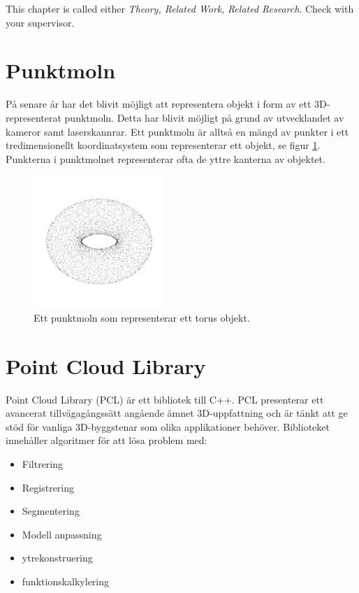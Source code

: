 This chapter is called either \emph{Theory, Related Work}, 
\emph{Related Research}. Check with your supervisor.
\newpage










\section{Punktmoln}
På senare år har det blivit möjligt att representera objekt i form av ett 3D-representerat punktmoln. Detta har blivit möjligt på grund av utvecklandet av kameror samt laserskannrar. Ett punktmoln är alltså en mängd av punkter i ett tredimensionellt koordinatsystem som representerar ett objekt, se figur \ref{fig:point_cloud_torus}. Punkterna i punktmolnet representerar ofta de yttre kanterna av objektet.

\begin{figure}[H]
	\centering
	\includegraphics[width=50mm]{figures/Point_cloud_torus.png}
	\caption{Ett punktmoln som representerar ett torus objekt.}
	\label{fig:point_cloud_torus}
\end{figure}


\section{Point Cloud Library}
Point Cloud Library (PCL) är ett bibliotek till C++. PCL presenterar ett avancerat tillvägagångssätt angående ämnet 3D-uppfattning och är tänkt att ge stöd för vanliga 3D-byggstenar som olika applikationer behöver. Biblioteket innehåller algoritmer för att lösa problem med:

\begin{itemize}
	\item Filtrering
	\item Registrering
	\item Segmentering
	\item Modell anpassning
	\item ytrekonstruering
	\item funktionskalkylering
\end{itemize}

